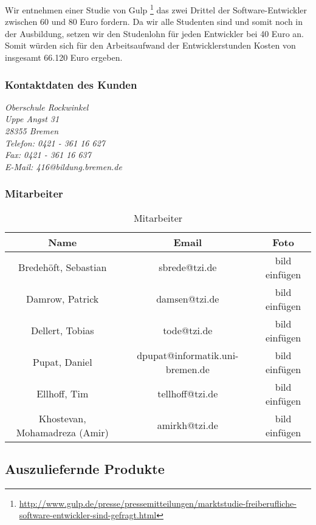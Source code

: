 \documentclass[fontsize=12pt,paper=a4,twoside]{scrartcl}
\begin{document}
Wir entnehmen einer Studie von Gulp \footnote{\url{http://www.gulp.de/presse/pressemitteilungen/marktstudie-freiberufliche-software-entwickler-sind-gefragt.html}} das zwei Drittel der Software-Entwickler zwischen 60 und 80 Euro fordern. Da wir alle Studenten sind und somit noch in der Ausbildung, setzen wir den Studenlohn für jeden Entwickler bei 40 Euro an. Somit würden sich für den Arbeitsaufwand der Entwicklerstunden Kosten von insgesamt 66.120 Euro ergeben.

\subsubsection{Kontaktdaten des Kunden}

{\em Oberschule Rockwinkel\\
	Uppe Angst 31 \\
	28355 Bremen \\
	Telefon: 0421 - 361 16 627 \\
	Fax: 0421 - 361 16 637 \\
	E-Mail: 416@bildung.bremen.de\\}

\subsubsection{Mitarbeiter}

\begin{table}[htbp]
\caption{Mitarbeiter}
\begin{tabular}{|c|c|c|}
\hline 
\textbf{Name} & \textbf{Email} & \textbf{Foto}\\ \hline \hline
Bredehöft, Sebastian & sbrede@tzi.de & bild einfügen \\ \hline
Damrow, Patrick & damsen@tzi.de & bild einfügen\\ \hline
Dellert, Tobias & tode@tzi.de & bild einfügen\\\hline
Pupat, Daniel & dpupat@informatik.uni-bremen.de & bild einfügen \\ \hline
Ellhoff, Tim & tellhoff@tzi.de & bild einfügen\\ \hline
Khostevan, Mohamadreza (Amir) & amirkh@tzi.de & bild einfügen \\ \hline
\end{tabular}
\end{table}

\subsection{Auszuliefernde Produkte\\}
\end{document}
